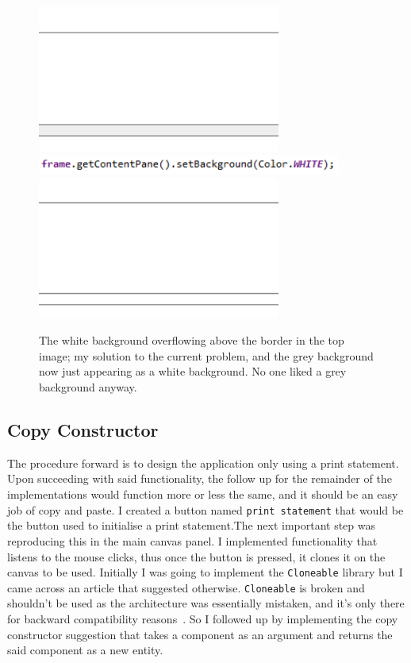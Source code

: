 \documentclass[a4paper, 12pt]{article}
\begin{document}
            \begin{figure}[h]
                \centering
                \includegraphics[width=80mm]{colour_overfill.png}
                \includegraphics[width=100mm]{overfill_solution.png}
                \includegraphics[width=80mm]{no_overfill.png}
                \caption{The white background overflowing above the border in the top image; my solution
                to the current problem, and the grey background now just appearing as a white background.
                No one liked a grey background anyway.}
            \end{figure}
        
        \clearpage
        \subsection{Copy Constructor}
            The procedure forward is to design the application only using a print statement. Upon
            succeeding with said functionality, the follow up for the remainder of the implementations
            would function more or less the same, and it should be an easy job of copy and paste.
            I created a button named \texttt{print statement} that would be the button used to initialise
            a print statement.The next important step was reproducing this in the main canvas panel.
            I implemented functionality that listens to the mouse clicks, thus once the button is
            pressed, it clones it on the canvas to be used. Initially I was going to implement the
            \texttt{Cloneable} library but I came across an article that suggested otherwise.
            \texttt{Cloneable} is broken and shouldn't be used as the architecture was essentially
            mistaken, and it's only there for backward compatibility reasons~\cite{billVenners}. So I followed up
            by implementing the copy constructor suggestion that takes a component as an argument and
            returns the said component as a new entity. \\
\end{document}
